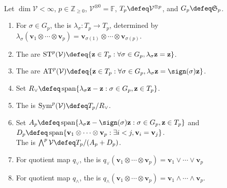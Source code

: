 \begin{definition} \label{def:permutation-action-on-tensor-powers}\label{def:symmetric-and-exterior-tensor-spaces} \\
Let $\dim\mathcal{V}<\infty$, $p\in\mathbb{Z}_{\geq0}$, $\mathcal{V}^{\otimes0}=\mathbb{F}$, $T_p\defeq\mathcal{V}^{\otimes p}$, and $G_p\defeq\mathfrak{S}_p$.
\begin{enumerate}[label=(\roman*)]
\setlength{\itemsep}{0pt}
\item For $\sigma\in G_p$, the  is $\lambda_{\sigma}:T_p\to T_p$, determined by $\lambda_{\sigma}(\mathbf{v}_1\otimes\cdots\otimes\mathbf{v}_p)=\mathbf{v}_{\sigma(1)}\otimes\cdots\otimes\mathbf{v}_{\sigma(p)}$.
\item The  are $\operatorname{ST}^{p}(\mathcal{V})\defeq\{\mathbf{z}\in T_p:\forall\sigma\in G_p,\lambda_{\sigma}\mathbf{z}=\mathbf{z}\}$.
\item The  are $\operatorname{AT}^{p}(\mathcal{V})\defeq\{\mathbf{z}\in T_p:\forall\sigma\in G_p,\lambda_{\sigma}\mathbf{z}=\sign(\sigma)\mathbf{z}\}$.
\item Set $R_{\vee}\defeq\operatorname{span}\{\lambda_{\sigma}\mathbf{z}-\mathbf{z}:\sigma\in G_p,\mathbf{z}\in T_p\}$.
\item The  is $\operatorname{Sym}^{p}(\mathcal{V})\defeq T_p/R_{\vee}$.
\item Set $A_p\defeq\operatorname{span}\{\lambda_{\sigma}\mathbf{z}-\sign(\sigma)\mathbf{z}:\sigma\in G_p,\mathbf{z}\in T_p\}$ and $D_p\defeq\operatorname{span}\{\mathbf{v}_1\otimes\cdots\otimes\mathbf{v}_p:\exists i<j,\mathbf{v}_i=\mathbf{v}_j\}$.\\
The  is $\bigwedge^{p}\mathcal{V}\defeq T_p/(A_p+D_p)$.
\item For quotient map $q_{\vee}$, the  is $q_{\vee}(\mathbf{v}_1\otimes\cdots\otimes\mathbf{v}_p)=\mathbf{v}_1\vee\cdots\vee\mathbf{v}_p$
\item For quotient map $q_{\wedge}$, the  is $q_{\wedge}(\mathbf{v}_1\otimes\cdots\otimes\mathbf{v}_p)=\mathbf{v}_1\wedge\cdots\wedge\mathbf{v}_p$.
\end{enumerate}
\end{definition}


